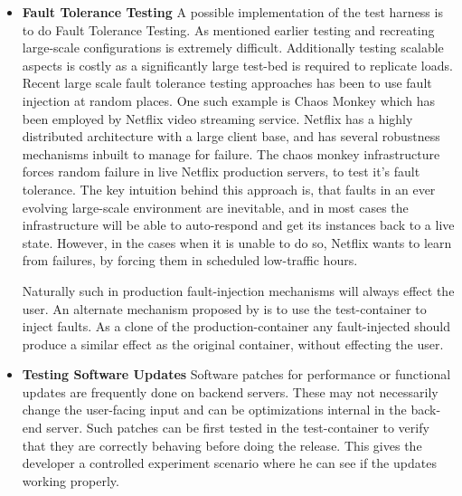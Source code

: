 \begin{itemize}
\item \textbf{Fault Tolerance Testing}
    A possible implementation of the \parikshan test harness is to do Fault Tolerance Testing.
As mentioned earlier testing and recreating large-scale configurations is extremely difficult.
Additionally testing scalable aspects is costly as a significantly large test-bed is required to replicate loads. 
Recent large scale fault tolerance testing approaches has been to use fault injection at random places.
One such example is Chaos Monkey\cite{chaosmonkey} which has been employed by Netflix \cite{netflix} video streaming service. 
Netflix has a highly distributed architecture with a large client base, and has several robustness mechanisms inbuilt to manage for failure. 
The chaos monkey infrastructure forces random failure in live Netflix production servers, to test it's fault tolerance.
The key intuition behind this approach is, that faults in an ever evolving large-scale environment are inevitable, and in most cases the infrastructure will be able to auto-respond and get its instances back to a live state. 
However, in the cases when it is unable to do so, Netflix wants to learn from failures, by forcing them in scheduled low-traffic hours.

Naturally such in production fault-injection mechanisms will always effect the user. 
An alternate mechanism proposed by \parikshan is to use the test-container to inject faults. 
As a clone of the production-container any fault-injected should produce a similar effect as the original container, without effecting the user.

  \item \textbf{Testing Software Updates}
Software patches for performance or functional updates are frequently done on backend servers. 
These may not necessarily change the user-facing input and can be optimizations internal in the back-end server.
Such patches can be first tested in the test-container to verify that they are correctly behaving before doing the release.
This gives the developer a controlled experiment scenario where he can see if the updates working properly.


\end{itemize}
